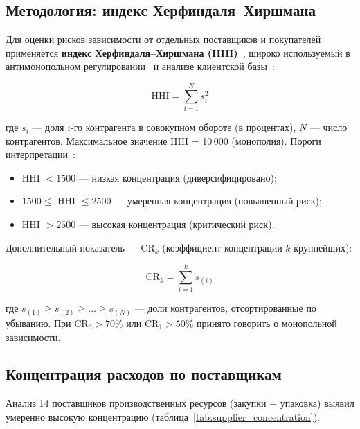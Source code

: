 \subsection{Методология: индекс Херфиндаля--Хиршмана}

Для оценки рисков зависимости от отдельных поставщиков и покупателей применяется \textbf{индекс Херфиндаля--Хиршмана (HHI)}~\cite{rhoades1993herfindahl}, широко используемый в антимонопольном регулировании~\cite{doj_hhi} и анализе клиентской базы~\cite{shapiro2010horizontal}:

\begin{equation}
\text{HHI} = \sum_{i=1}^{N} s_i^2
\end{equation}

где $s_i$ --- доля $i$-го контрагента в совокупном обороте (в процентах), $N$ --- число контрагентов. Максимальное значение HHI = 10\,000 (монополия). Пороги интерпретации~\cite{doj_hhi}:
\begin{itemize}
  \item HHI $< 1500$ --- низкая концентрация (диверсифицировано);
  \item $1500 \le$ HHI $\le 2500$ --- умеренная концентрация (повышенный риск);
  \item HHI $> 2500$ --- высокая концентрация (критический риск).
\end{itemize}

Дополнительный показатель --- CR$_k$ (коэффициент концентрации $k$ крупнейших):

\begin{equation}
\text{CR}_k = \sum_{i=1}^{k} s_{(i)}
\end{equation}

где $s_{(1)} \ge s_{(2)} \ge \dots \ge s_{(N)}$ --- доли контрагентов, отсортированные по убыванию. При CR$_3 > 70\%$ или CR$_1 > 50\%$ принято говорить о монопольной зависимости.

\subsection{Концентрация расходов по поставщикам}

Анализ 14 поставщиков производственных ресурсов (закупки + упаковка) выявил умеренно высокую концентрацию (таблица~\ref{tab:supplier_concentration}).

